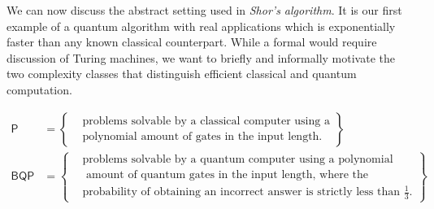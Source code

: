 \documentclass[a4paper, oneside, 12pt]{amsart}
\newcommand*{\Pclass}{\ensuremath{\mathsf{P}}}
\newcommand*{\BQPclass}{\ensuremath{\mathsf{BQP}}}
\begin{document}
We can now discuss the abstract setting used in \emph{Shor's algorithm}.
It is our first example of a quantum algorithm with real applications which is exponentially faster than any known classical counterpart.
While a formal would require discussion of \eg Turing machines,
we want to briefly and informally motivate the two complexity classes
that distinguish efficient classical and quantum computation.

\begin{align*}
  \Pclass &= \left\{
            \begin{aligned}
              &\text{problems solvable by a classical computer using a}\\
              &\text{polynomial amount of gates in the input length.}
            \end{aligned}
            \right\}\\
  \BQPclass &= \left\{
              \begin{aligned}
                &\text{problems solvable by a quantum computer using a polynomial}\\ &\text{ amount of quantum gates in the input length, where the} \\
                &\text{probability of obtaining an incorrect answer is strictly less than  \(\tfrac{1}{3}\).}
              \end{aligned}
              \right\}
\end{align*}
\medskip
\end{document}
